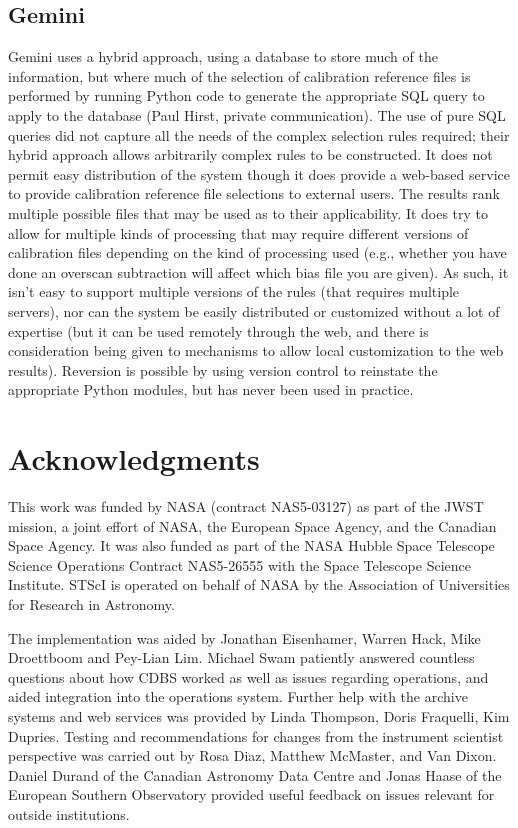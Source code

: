 \documentclass[final,authoryear,5p,times,twocolumn]{elsarticle}
\begin{document}
\subsection{Gemini}

Gemini uses a hybrid approach, using a database to store much of the 
information, but where much of the selection of calibration reference 
files is performed by running Python code to generate the appropriate 
SQL query to apply to the database (Paul Hirst, private communication). 
The use of pure SQL queries did not capture all the needs of the 
complex selection rules required; their hybrid approach allows arbitrarily
complex rules to be constructed. It does not permit easy distribution of the 
system though it does provide a web-based service to provide calibration 
reference file selections to external users. The results rank multiple 
possible files that may be used as to their applicability. It does try 
to allow for multiple kinds of processing that may require different 
versions of calibration files depending on the kind of processing used 
(e.g., whether you have done an overscan subtraction will affect which 
bias file you are given). As such, it isn’t easy to support multiple 
versions of the rules (that requires multiple servers), nor can the 
system be easily distributed or customized without a lot of expertise 
(but it can be used remotely through the web, and there is consideration 
being given to mechanisms to allow local customization to the web results). 
Reversion is possible by using version control to reinstate the 
appropriate Python modules, but has never been used in practice.

\section{Acknowledgments}

This work was funded by NASA (contract NAS5-03127) as part of the JWST mission, a joint effort of NASA, the European Space Agency, and the Canadian Space Agency. It was also funded as part of the NASA Hubble Space Telescope Science Operations Contract NAS5-26555 with the Space Telescope Science Institute.
STScI is operated on behalf of NASA by the Association of Universities for Research in Astronomy.

The implementation was aided by Jonathan Eisenhamer, Warren Hack, Mike Droettboom
and Pey-Lian Lim. 
Michael Swam patiently answered countless questions about how CDBS
worked as well as issues regarding operations, and aided integration into the 
operations system. Further help with the archive systems and web services
was provided by Linda Thompson, Doris Fraquelli, Kim Dupries.
Testing and recommendations for changes from the instrument scientist
perspective was carried out by Rosa Diaz, Matthew McMaster, and Van Dixon.
Daniel Durand of the Canadian Astronomy Data Centre and Jonas Haase of the
European Southern Observatory provided useful feedback on issues relevant
for outside institutions.
\end{document}
